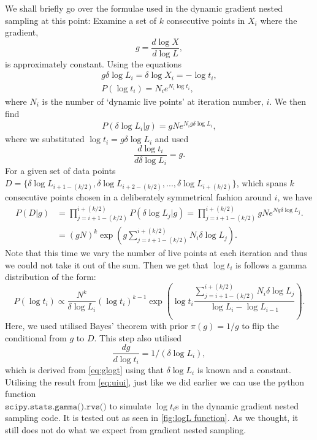 We shall briefly go over the formulae used in the dynamic gradient nested sampling at this point: Examine a set of $k$ consecutive points in ${X_i}$ where the gradient,
\begin{equation}
g= \frac{d \log X}{d \log L},
\end{equation}
%
is approximately constant. Using the equations 
%
\begin{align}
g \delta \log L_{i} = \delta \log X_i= -\log t_i, \\
P(\log t_{i})=N_i e^{N_i \log t_i},
\end{align}
%
where $N_i$ is the number of `dynamic live points' at iteration number, $i$. We then find
%
\begin{align}
P(\delta \log L_i|g)= gNe^{N_i g \delta \log L_i},
\end{align}
%
where we substituted  $\log t_i= g\delta \log L_i$ and used 
%
\begin{equation}
    \frac{d \log t_i}{d\delta \log L_i}= g.
\end{equation}
%
For a given set of data points $D= \{ \delta \log L_{i+1-(k/2)},\delta \log L_{i+2-(k/2)},...,\delta \log L_{i+(k/2)} \}$, which spans $k$ consecutive points chosen in a deliberately symmetrical fashion around $i$, we have
%
\begin{align}
P(D|g)&= \prod_{j=i+1-(k/2)}^{i+(k/2)} P(\delta \log L_j|g) = \prod_{j=i+1-(k/2)}^{i+(k/2)} gNe^{Ng \delta \log L_j}.\\
&=  (gN)^k\exp\left( g \sum_{j=i+1-(k/2)}^{i+(k/2)} N_i \delta \log L_j\right).
\end{align}
%
Note that this time we vary the number of live points at each iteration and thus we could not take it out of the sum. Then we get that $\log t_i$ is follows a gamma distribution \cite{hogg_craig_1971} of the form:
%
\begin{equation}
P(\log t_i) \propto \frac{N^k}{\delta \log L_i}(\log t_i)^{k-1} \exp \left( \log t_i \frac{\sum_{j=i+1-(k/2)}^{i+(k/2)} N_i \delta \log L_j}{\log L_i-\log L_{i-1}}\right).
\label{eq:uiui}
\end{equation}
%
Here, we used utilised Bayes' theorem with prior $\pi (g)=1/g$ to flip the conditional from $g$ to $D$. This step also utilised
%
\begin{equation}
  \frac{dg}{d\log t_i}  = 1/(\delta \log L_{i}),
\end{equation}
%
which is derived from \cref{eq:glogt} using that $\delta \log L_{i}$ is known and a constant. Utilising the result from \cref{eq:uiui}, just like we did earlier we can use the python function \\ $\texttt{scipy.stats.gamma().rvs()}$ to simulate $\log t_i$s in the dynamic gradient nested sampling code. It is tested out as seen in \cref{fig:logL function}. As we thought, it still does not do what we expect from gradient nested sampling.

